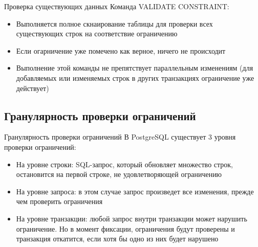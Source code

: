 \documentclass[12pt]{article}
\begin{document}
\begin{nota}{Проверка существующих данных}
    Команда VALIDATE CONSTRAINT:

    \begin{itemize}
        \item Выполняется полное скнаирование таблицы для проверки всех существующих строк на соответствие ограничению 
        \item Если огарничение уже помечено как верное, ничего не происходит 
        \item Выполнение этой команды не препятствует параллельным изменениям (для добавляемых или изменяемых строк в других транзакциях ограничение уже действует)
    \end{itemize}
\end{nota}

\newpage

\subsection{Гранулярность проверки ограничений}

\begin{nota}{Гранулярность проверки ограничений}
    В PostgreSQL существует 3 уровня проверки ограничений:

    \begin{itemize}
        \item На уровне строки: SQL-запрос, который обновляет множество строк, остановится на первой строке, не удовлетворяющей ограничению 
        \item На уровне запроса: в этом случае запрос произведет все изменения, прежде чем проверить ограничения 
        \item На уровне транзакции: любой запрос внутри транзакции может нарушить ограничение. Но в момент фиксации, ограничения будут проверены и транзакция откатится, если хотя бы одно из них будет нарушено 
    \end{itemize}
\end{nota}
\end{document}
